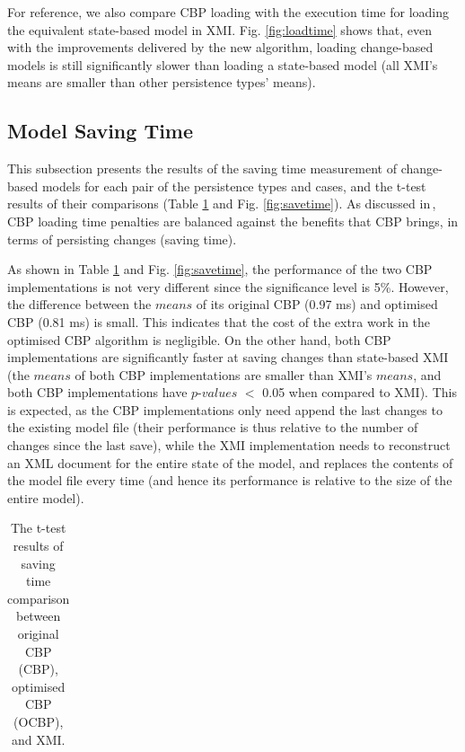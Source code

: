 \documentclass{llncs}
\begin{document}
{For reference, we also compare CBP loading with the execution time for loading the equivalent state-based model in XMI. Fig. \ref{fig:loadtime} shows that, even with the improvements delivered by the new algorithm, loading change-based models is still significantly slower than loading a state-based model (all XMI's means are smaller than other persistence types' means).

\vspace{-15pt}
\subsection{Model Saving Time}
\label{subsec:saving_time_test}

\vspace{-10pt}
This subsection presents the results of the saving time measurement of change-based models for each pair of the persistence types and cases, and the t-test results of their comparisons (Table \ref{table:ttest_results_savetime} and Fig. \ref{fig:savetime}). As discussed in\,\cite{yohannis2017turning}, CBP loading time penalties are balanced against the benefits that CBP brings, in terms of  persisting changes (saving time).

\vspace{-2pt}
As shown in Table \ref{table:ttest_results_savetime} and Fig. \ref{fig:savetime}, the performance of the two CBP implementations is not very different since the significance level is 5\%. However, the difference between the $means$ of its original CBP (0.97 ms) and optimised CBP (0.81 ms) is small. This indicates that the cost of the extra work in the optimised CBP algorithm is negligible. On the other hand, both CBP implementations are significantly faster at saving changes than state-based XMI (the $means$ of both CBP implementations are smaller than XMI's $means$, and both CBP implementations have $p$-$values$ $<$ 0.05 when compared to XMI). This is expected, as the CBP implementations only need append the last changes to the existing model file (their performance is thus relative to the number of changes since the last save), while the XMI implementation needs to reconstruct an XML document for the entire state of the model, and replaces the contents of the model file every time (and hence its performance is relative to the size of the entire model). 


\begin{table}[t]
\footnotesize
\centering
\caption{The t-test results of saving time comparison between original CBP (CBP), optimised CBP (OCBP), and XMI.}
\label{table:ttest_results_savetime}
\begin{tabular}
{|p{}p{}p{}|p{}p{}p{}p{}|}
\hline 


\end{tabular}
\end{table}}
\end{document}
